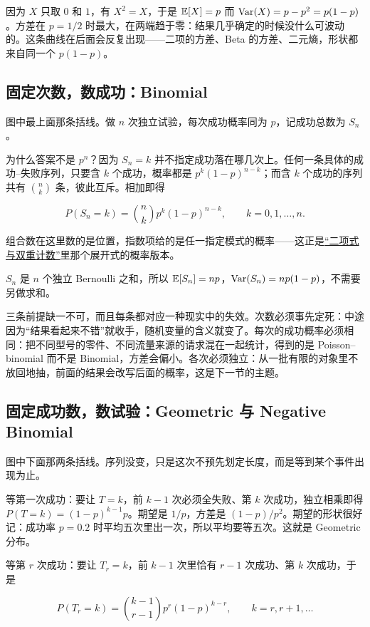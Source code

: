 因为 \(X\) 只取 \(0\) 和 \(1\)，有 \(X^2=X\)，于是 \(\mathbb{E}[X]=p\) 而 \(\operatorname{Var}(X)=p-p^2=p(1-p)\)。方差在 \(p=1/2\) 时最大，在两端趋于零：结果几乎确定的时候没什么可波动的。这条曲线在后面会反复出现——二项的方差、Beta 的方差、二元熵，形状都来自同一个 \(p(1-p)\)。

\subsection{固定次数，数成功：Binomial}

图中最上面那条括线。做 \(n\) 次独立试验，每次成功概率同为 \(p\)，记成功总数为 \(S_n\)。

为什么答案不是 \(p^n\)？因为 \(S_n=k\) 并不指定成功落在哪几次上。任何一条具体的成功--失败序列，只要含 \(k\) 个成功，概率都是 \(p^k(1-p)^{n-k}\)；而含 \(k\) 个成功的序列共有 \(\binom nk\) 条，彼此互斥。相加即得

\[
P(S_n=k)=\binom nk p^k(1-p)^{n-k},\qquad k=0,1,\ldots,n.
\]

组合数在这里数的是位置，指数项给的是任一指定模式的概率——这正是\hyperref[sec:04-Discrete-Mathematics/01-Combinatorics/02]{``二项式与双重计数''}里那个展开式的概率版本。

\(S_n\) 是 \(n\) 个独立 Bernoulli 之和，所以 \(\mathbb{E}[S_n]=np\)，\(\operatorname{Var}(S_n)=np(1-p)\)，不需要另做求和。

三条前提缺一不可，而且每条都对应一种现实中的失效。次数必须事先定死：中途因为``结果看起来不错''就收手，随机变量的含义就变了。每次的成功概率必须相同：把不同型号的零件、不同流量来源的请求混在一起统计，得到的是 Poisson--binomial 而不是 Binomial，方差会偏小。各次必须独立：从一批有限的对象里不放回地抽，前面的结果会改写后面的概率，这是下一节的主题。

\subsection{固定成功数，数试验：Geometric 与 Negative Binomial}

图中下面那两条括线。序列没变，只是这次不预先划定长度，而是等到某个事件出现为止。

等第一次成功：要让 \(T=k\)，前 \(k-1\) 次必须全失败、第 \(k\) 次成功，独立相乘即得 \(P(T=k)=(1-p)^{k-1}p\)。期望是 \(1/p\)，方差是 \((1-p)/p^2\)。期望的形状很好记：成功率 \(p=0.2\) 时平均五次里出一次，所以平均要等五次。这就是 Geometric 分布。

等第 \(r\) 次成功：要让 \(T_r=k\)，前 \(k-1\) 次里恰有 \(r-1\) 次成功、第 \(k\) 次成功，于是

\[
P(T_r=k)=\binom{k-1}{r-1}p^r(1-p)^{k-r},\qquad k=r,r+1,\ldots
\]


